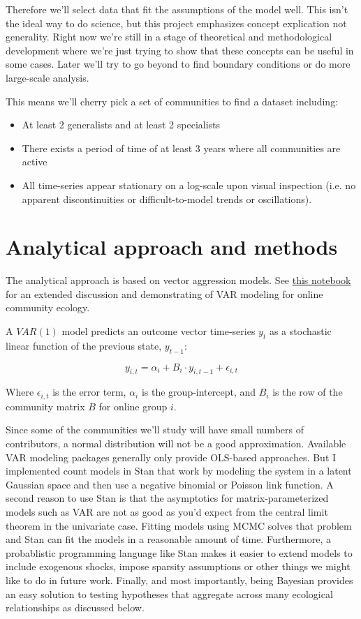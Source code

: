 \documentclass[12pt]{memoir}
\begin{document}
Therefore we'll select data that fit the assumptions of the model well.  This isn't the ideal way to do science, but this project emphasizes concept explication not generality.  Right now we're still in a stage of theoretical and methodological development where we're just trying to show that these concepts can be useful in some cases. Later we'll try to go beyond to find boundary conditions or do more large-scale analysis. 

This means we'll cherry pick a set of communities to find a dataset including:

\begin{itemize}
\item At least 2 generalists and at least 2 specialists
\item There exists a period of time of at least 3 years where all communities are active
\item All time-series appear stationary on a log-scale upon visual inspection (i.e. no apparent discontinuities or difficult-to-model trends or oscillations).
\end{itemize}


\section{Analytical approach and methods}

The analytical approach is based on vector aggression models.  See \href{https://teblunthuis.cc/outgoing/private/notebook_share/notebook-exported.html}{this notebook} for an extended discussion and demonstrating of VAR modeling for online community ecology.

A $VAR(1)$ model predicts an outcome vector time-series $y_t$ as a stochastic linear function of the previous state, $y_{t-1}$:

$$ y_{i,t} = \alpha_i + B_i \cdot y_{i,t-1} + \epsilon_{i,t} $$

Where $\epsilon_{i,t}$ is the error term, $\alpha_{i}$ is the group-intercept, and $B_i$ is the row of the community matrix $B$ for online group $i$.

Since some of the communities we'll study will have small numbers of contributors, a normal distribution will not be a good approximation.  Available VAR modeling packages generally only provide OLS-based approaches. But I implemented count models in Stan that work by modeling the system in a latent Gaussian space and then use a negative binomial or Poisson link function. A second reason to use Stan is that the asymptotics for matrix-parameterized models such as VAR are not as good as you'd expect from the central limit theorem in the univariate case.  Fitting models using MCMC solves that problem and Stan can fit the models in a reasonable amount of time.  Furthermore, a probablistic programming language like Stan makes it easier to extend models to include exogenous shocks, impose sparsity assumptions or other things we might like to do in future work. Finally, and most importantly, being Bayesian provides an easy solution to testing hypotheses that aggregate across many ecological relationships as discussed below.
\end{document}
